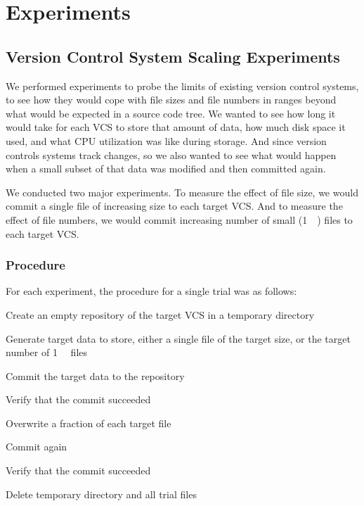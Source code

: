 \chapter{Experiments}




\section{Version Control System Scaling Experiments}

We performed experiments to probe the limits of existing version control
systems, to see how they would cope with file sizes and file numbers in ranges
beyond what would be expected in a source code tree. We wanted to see how long
it would take for each VCS to store that amount of data, how much disk space it
used, and what CPU utilization was like during storage. And since version
controls systems track changes, so we also wanted to see what would happen when
a small subset of that data was modified and then committed again.

We conducted two major experiments. To measure the effect of file size, we would
commit a single file of increasing size to each target VCS. And to measure
the effect of file numbers, we would commit increasing number of small
(\SI{1}{\kibi\byte}) files to each target VCS.


\subsection{Procedure}

For each experiment, the procedure for a single trial was as follows:

\begin{tight_enumerate}

    \item Create an empty repository of the target VCS in a temporary directory

    \item Generate target data to store, either a single file of the target
        size, or the target number of \SI{1}{\kibi\byte} files

    \item Commit the target data to the repository

    \item Verify that the commit succeeded

    \item Overwrite a fraction of each target file

    \item Commit again

    \item Verify that the commit succeeded

    \item Delete temporary directory and all trial files

\end{tight_enumerate}

